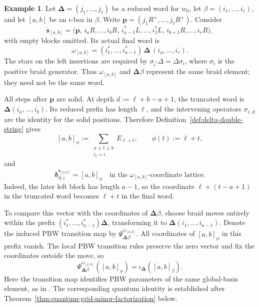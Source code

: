 \documentclass[12pt, reqno]{amsart}
\theoremstyle{plain}
\theoremstyle{definition}
\newtheorem{example}[theorem]{Example}
\numberwithin{equation}{section}
\begin{document}
\begin{example}
\label{ex:delta-braid-i-box}
Let \(\boldsymbol\Delta=(j_1,\ldots,j_\ell)\) be a reduced word
for \(w_0\), let \(\beta=(i_1,\ldots,i_r)\), and let \([a,b]\)
be an \(i\)-box in \(\beta\). Write
\(\mathbf p=(j_1R^+,\ldots,j_\ell R^+)\). Consider
\begin{equation}\label{eq:double-string-i-box}
 \ddot{\mathbf s}_{[a,b]}
 =\bigl(
   \mathbf p,\,
   i_aR,\ldots,i_bR,\,
   i_{a-1}^*L,\ldots,i_1^*L,\,
   i_{b+1}R,\ldots,i_rR
  \bigr),
\end{equation}
with empty blocks omitted. Its actual final word is
\begin{equation}\label{eq:i-box-actual-word}
    \omega_{[a,b]}
    =(i_1^*,\ldots,i_{a-1}^*)\,
      \boldsymbol\Delta\,(i_a,\ldots,i_r).
\end{equation}
The stars on the left insertions are required by
\(\sigma_{i^*}\Delta=\Delta\sigma_i\), where \(\sigma_i\) is
the positive braid generator. Thus \(\omega_{[a,b]}\) and
\(\boldsymbol\Delta\beta\) represent the same braid element;
they need not be the same word.

All steps after \(\mathbf p\) are solid. At depth
\(d:=\ell+b-a+1\), the truncated word is
\(\boldsymbol\Delta(i_a,\ldots,i_b)\). Its reduced prefix has
length \(\ell\), and the intervening operators \(\sigma_{e,d}\)
are the identity for the solid positions. Therefore
Definition~\ref{def:delta-double-string} gives
\begin{equation}\label{eq:i-box-vector}
    [a,b]_\phi
    :=\sum_{\substack{a\leq t\leq b\\ i_t=i}}E_{\ell+t},
    \qquad \phi(t):=\ell+t,
\end{equation}
and
\begin{equation}\label{eq:i-box-degree}
    \boldsymbol\delta_{d,i}^{\ddot{\mathbf s}_{[a,b]}}
    =[a,b]_\phi
    \quad\text{in the \(\omega_{[a,b]}\)-coordinate lattice.}
\end{equation}
Indeed, the later left block has length \(a-1\), so the coordinate
\(\ell+(t-a+1)\) in the truncated word becomes \(\ell+t\)
in the final word.

To compare this vector with the coordinates of
\(\boldsymbol\Delta\beta\), choose braid moves entirely within
the prefix
\((i_1^*,\ldots,i_{a-1}^*)\boldsymbol\Delta\), transforming it
to \(\boldsymbol\Delta(i_1,\ldots,i_{a-1})\). Denote the induced
PBW transition map by
\(\Psi_{\boldsymbol\Delta\beta}^{\omega_{[a,b]}}\).
All coordinates of \([a,b]_\phi\) in this prefix vanish. The
local PBW transition rules preserve the zero vector and fix the
coordinates outside the move, so
\begin{equation}\label{eq:i-box-PBW-transition}
    \Psi_{\boldsymbol\Delta\beta}^{\omega_{[a,b]}}
       ([a,b]_\phi)
    =\iota_{\boldsymbol\Delta}([a,b]_\beta).
\end{equation}
Here the transition map identifies PBW parameters of the same
global-basis element, as in
\cite[Theorem~4.12]{bi2026towards}. The corresponding quantum
identity is established after
Theorem~\ref{thm:quantum-grid-minor-factorization} below.
\end{example}
\end{document}
